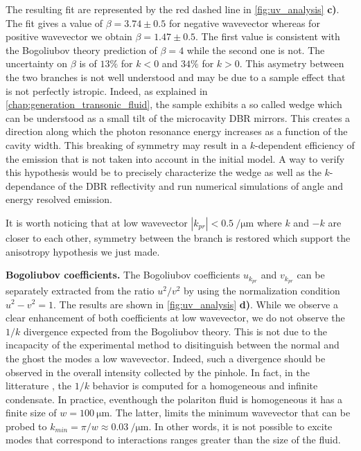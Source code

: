 The resulting fit are represented by the red dashed line in \autoref{fig:uv_analysis} \textbf{c)}. The fit gives a value of $\beta=3.74\pm0.5$ for negative wavevector whereas for positive wavevector we obtain $\beta=1.47\pm{0.5}$. The first value is consistent with the Bogoliubov theory prediction of $\beta=4$ while the second one is not. The uncertainty on $\beta$ is of $13\%$ for $k<0$ and $34\%$ for $k>0$. 
 This asymetry between the two branches is not well understood and may be due to a sample effect that is not perfectly istropic. Indeed, 
as explained in \autoref{chap:generation_transonic_fluid}, the sample exhibits a so called wedge which can be understood as a small tilt of the microcavity DBR mirrors. This creates a direction along which the photon resonance energy increases as a function of the cavity width.
This breaking of symmetry may result in a $k$-dependent efficiency of the emission that is not taken into account in the initial model. A way to verify this hypothesis would be to precisely characterize the wedge as well as the $k$-dependance of the DBR reflectivity and run numerical simulations of angle and energy resolved emission. 

It is worth noticing that at low wavevector $|k_{pr}|<\SI{0.5}{\per\micro\meter}$ where $k$ and $-k$ are closer to each other, symmetry between the branch is restored which support the anisotropy hypothesis 
we just made.

\bigskip

\textbf{Bogoliubov coefficients.} The Bogoliubov coefficients $u_{k_{pr}}$ and $v_{k_{pr}}$ can be separately extracted from the ratio $u^2/v^2$ by using the normalization condition $u^2-v^2=1$. The 
results are shown in \autoref{fig:uv_analysis} \textbf{d)}. While we observe a clear enhancement of both coefficients at low wavevector, we do not observe the $1/k$ divergence expected from the Bogoliubov theory. This is not due to the incapacity of the experimental method to disitinguish  between the normal and the ghost the modes a low wavevector. Indeed,
such a divergence should be observed in the overall intensity collected by the pinhole.
In fact, in the litterature \cite{pitaevskij_bose-einstein_2016,castin_bose-einstein_2001,pethick_bose-einstein_2008}, the $1/k$ behavior is computed for a homogeneous and infinite condensate. In practice, eventhough the polariton fluid is homogeneous it has a finite size of $w=\SI{100}{\micro\meter}$. The latter,
limits the minimum wavevector that can be probed to $k_{min}=\pi/w\approx\SI{0.03}{\per\micro\meter}$. In other words, it is not possible to excite modes that correspond to interactions ranges greater than the size of the fluid.

